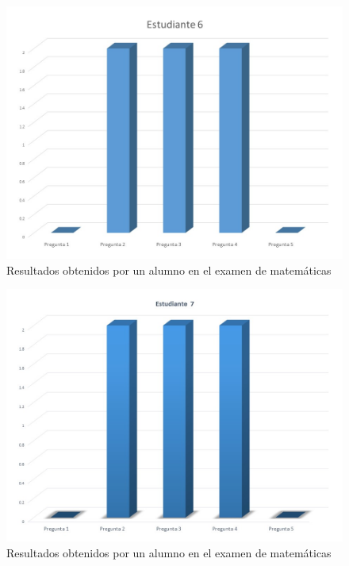 \documentclass[12pt] {report}
\begin{document}
\begin{figure}[H]
\centering 
\includegraphics[scale=.7]{MEstudiante6.JPG}
\caption{Resultados obtenidos por un alumno en el examen de matemáticas}
\end{figure}
\begin{figure}[H]
\centering 
\includegraphics[scale=.7]{MEstudiante7.JPG}
\caption{Resultados obtenidos por un alumno en el examen de matemáticas}
\end{figure}
\end{document}
